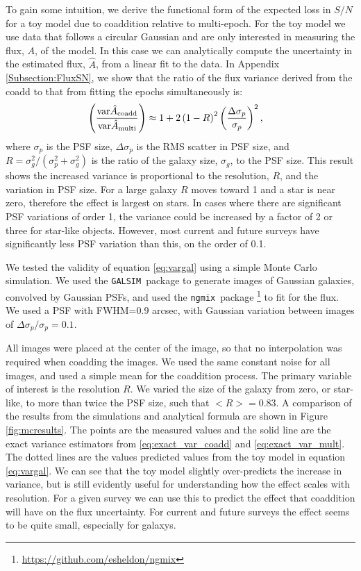 \documentclass[fleqn,useAMS,usenatbib]{mnras}
\newcommand{\galsim}{\texttt{GALSIM}}
\newcommand{\ngmix}{\texttt{ngmix}}
\newcommand{\coadd}{{\rm coadd}}
\begin{document}
To gain some intuition, we derive the functional form of the expected loss in $S/N$ for a toy model due to coaddition relative to multi-epoch.  For the toy model we use data that follows a circular Gaussian and are only interested in measuring the flux, $A$, of the model.  In this case we can analytically compute the uncertainty in the estimated flux, $\hat{A}$, from a linear fit to the data.  In Appendix \ref{Subsection:FluxSN}, we show that the ratio of the flux variance derived from the coadd to that from fitting the epochs simultaneously is:
\begin{align} \label{eq:vargal}
    \left( \frac{ {\rm var} \hat{A}_\coadd}{{\rm var} \hat{A}_{\rm multi} } \right) &
    \approx 1 + 2 \left( 1 - R \right)^2 \left( \frac{\Delta \sigma_p}{\sigma_p} \right)^2,
\end{align}
where $\sigma_p$ is the PSF size, $\Delta \sigma_p$ is the RMS scatter in PSF size, and $R=\sigma_g^2/(\sigma_p^2 + \sigma_g^2)$ is the ratio of the galaxy size, $\sigma_g$, to the PSF size.  This result shows the increased variance is proportional to the resolution, $R$, and the variation in PSF size.  For a large galaxy $R$ moves toward 1 and a star is near zero, therefore the effect is largest on stars.  In cases where there are significant PSF variations of order 1, the variance could be increased by a factor of 2 or three for star-like objects.  However, most current and future surveys have significantly less PSF variation than this, on the order of 0.1. 

We tested the validity of equation \ref{eq:vargal} using a simple Monte Carlo simulation.  We used the \galsim\ package to generate images of Gaussian galaxies, convolved by Gaussian PSFs, and used the \ngmix\ package \footnote{\url{https://github.com/esheldon/ngmix}} to fit for the flux. We used a PSF with FWHM=0.9 arcsec, with Gaussian variation between images of $\Delta \sigma_p/\sigma_p = 0.1$.

All images were placed at the center of the image, so that no interpolation was required when coadding the images.  We used the same constant noise for all images, and used a simple mean for the coaddition process.  The primary variable of interest is the resolution $R$.  We varied the size of the galaxy from zero, or star-like, to more than twice the PSF size, such that $<R> = 0.83$.  A comparison of the results from the simulations and analytical formula are shown in Figure \ref{fig:mcresults}.  The points are the measured values and the solid line are the exact variance estimators from \ref{eq:exact_var_coadd} and \ref{eq:exact_var_mult}.  The dotted lines are the values predicted values from the toy model in equation \ref{eq:vargal}.  We can see that the toy model slightly over-predicts the increase in variance, but is still evidently useful for understanding how the effect scales with resolution.  For a given survey we can use this to predict the effect that coaddition will have on the flux uncertainty.  For current and future surveys the effect seems to be quite small, especially for galaxys.
\end{document}
